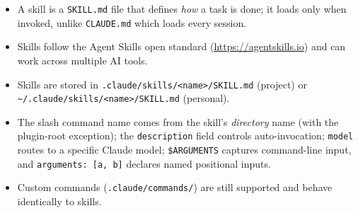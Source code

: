 \begin{summarybox}
\begin{itemize}
  \item A skill is a \texttt{SKILL.md} file that defines \emph{how} a task
        is done; it loads only when invoked, unlike \texttt{CLAUDE.md} which
        loads every session.
  \item Skills follow the Agent Skills open standard (\url{https://agentskills.io})
        and can work across multiple AI tools.
  \item Skills are stored in \texttt{.claude/skills/<name>/SKILL.md} (project)
        or \texttt{\textasciitilde/.claude/skills/<name>/SKILL.md} (personal).
  \item The slash command name comes from the skill's \emph{directory}
        name (with the plugin-root exception); the \texttt{description}
        field controls auto-invocation; \texttt{model} routes to a
        specific Claude model; \texttt{\$ARGUMENTS} captures
        command-line input, and \texttt{arguments: [a, b]} declares named
        positional inputs.
  \item Custom commands (\texttt{.claude/commands/}) are still supported and
        behave identically to skills.
\end{itemize}
\end{summarybox}

\nocite{*}
\printbibliography[heading=subbibliography,title={References}]
